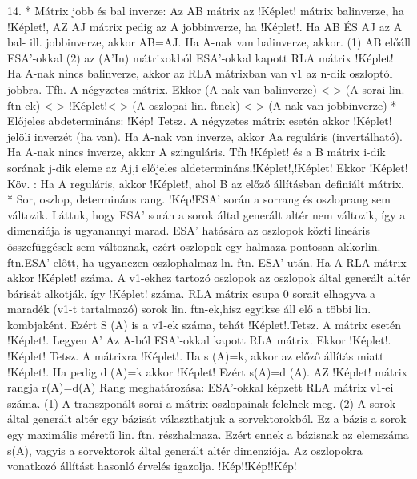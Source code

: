 \documentclass[10pt]{article}
\begin{document}
14.
* Mátrix jobb és bal inverze: Az AB mátrix az !Képlet! mátrix balinverze, ha !Képlet!, AZ AJ mátrix pedig az A jobbinverze, ha !Képlet!. Ha AB ÉS AJ az A bal- ill. jobbinverze, akkor AB=AJ. Ha A-nak van balinverze, akkor. (1) AB előáll ESA'-okkal (2) az  (A'In) mátrixokból ESA'-okkal kapott RLA mátrix !Képlet! Ha A-nak nincs balinverze, akkor az RLA mátrixban van v1 az n-dik oszloptól jobbra. Tfh. A négyzetes mátrix. Ekkor (A-nak van balinverze) <-> (A sorai lin. ftn-ek) <-> !Képlet!<-> (A oszlopai lin. ftnek) <-> (A-nak van jobbinverze)
* Előjeles abdetermináns: !Kép! Tetsz. A négyzetes mátrix esetén akkor !Képlet! jelöli inverzét (ha van). Ha A-nak van inverze, akkor Aa reguláris (invertálható). Ha A-nak nincs inverze, akkor A szinguláris. Tfh !Képlet! és a B mátrix i-dik sorának j-dik eleme az Aj,i előjeles aldetermináns.!Képlet!,!Képlet! Ekkor !Képlet! Köv. : Ha A reguláris, akkor !Képlet!, ahol B az előző állításban definiált mátrix.
* Sor, oszlop, determináns rang. !Kép!ESA' során a sorrang és oszloprang sem változik. Láttuk, hogy ESA' során a sorok által generált altér nem változik, így a dimenziója is ugyanannyi marad. ESA' hatására az oszlopok közti lineáris összefüggések sem változnak, ezért oszlopok egy halmaza pontosan akkorlin. ftn.ESA' előtt, ha ugyanezen oszlophalmaz ln. ftn. ESA' után. Ha A RLA mátrix akkor !Képlet! száma. A v1-ekhez tartozó oszlopok az oszlopok által generált altér bárisát alkotják, így !Képlet! száma. RLA mátrix csupa 0 sorait elhagyva a maradék (v1-t tartalmazó) sorok lin. ftn-ek,hisz egyikse áll elő a többi lin. kombjaként. Ezért S (A) is a v1-ek száma, tehát !Képlet!.Tetsz. A mátrix esetén !Képlet!. Legyen A' Az A-ból ESA'-okkal kapott RLA mátrix. Ekkor !Képlet!. !Képlet! Tetsz. A mátrixra !Képlet!. Ha s (A)=k, akkor az előző állítás miatt !Képlet!. Ha pedig d (A)=k akkor !Képlet! Ezért s(A)=d (A). AZ !Képlet! mátrix rangja r(A)=d(A) Rang meghatározása: ESA'-okkal képzett RLA mátrix v1-ei száma.
(1) A transzponált sorai a mátrix oszlopainak felelnek meg. (2) A sorok által generált altér egy bázisát választhatjuk a sorvektorokból. Ez a bázis a sorok egy maximális méretű lin. ftn. részhalmaza. Ezért ennek a bázisnak az elemszáma s(A), vagyis a sorvektorok által generált altér dimenziója. Az oszlopokra vonatkozó állítást hasonló érvelés igazolja.
!Kép!!Kép!!Kép!


	\section{}
		
		
\end{document}
